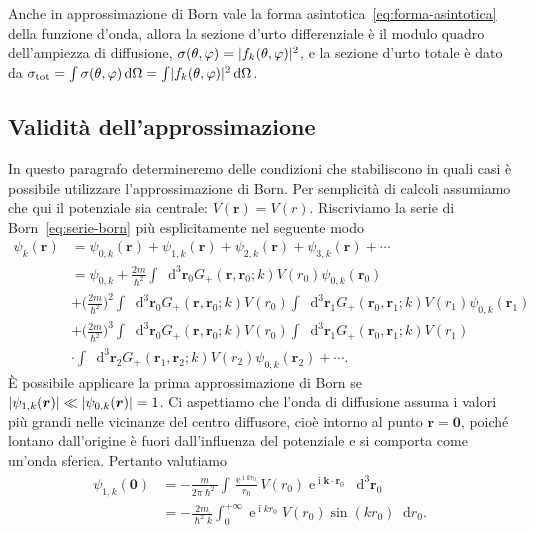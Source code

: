 \documentclass[a4paper,fleqn,twoside,12pt]{article}
\renewcommand{\phi}{\varphi}
\newcommand*{\dd}{\mathop{}\!\mathrm{d}} %
\DeclareMathOperator{\e}{\mathrm{e}} %
\DeclareMathOperator{\uimm}{\mathrm{i}} %
\DeclarePairedDelimiter{\abs}{\lvert}{\rvert}
\begin{document}
Anche in approssimazione di Born vale la forma
asintotica~\eqref{eq:forma-asintotica} della funzione d'onda, allora la sezione
d'urto differenziale è il modulo quadro dell'ampiezza di diffusione,
$\sigma(\theta,\phi) = \abs{f_{k}(\theta,\phi)}^{2}$, e la sezione d'urto totale
è dato da
$\sigma_{\textup{tot}} = \int \sigma(\theta,\phi) \dd\Omega = \int
\abs{f_{k}(\theta,\phi)}^{2} \dd\Omega$.

\subsection{Validità dell'approssimazione}
\label{sec:validita-born}

In questo paragrafo determineremo delle condizioni che stabiliscono in quali
casi è possibile utilizzare l'approssimazione di Born.  Per semplicità di
calcoli assumiamo che qui il potenziale sia centrale: $V(\bm{r}) = V(r)$.
Riscriviamo la serie di Born~\eqref{eq:serie-born} più esplicitamente nel
seguente modo
\begin{equation}
  \label{eq:serie-born-esplicita}
  \begin{split}
    \psi_{k}(\bm{r}) &= \psi_{0,k}(\bm{r}) + \psi_{1,k}(\bm{r}) +
    \psi_{2,k}(\bm{r}) + \psi_{3,k}(\bm{r}) + \cdots \\
    &=\psi_{0,k} + \frac{2 m}{\hslash^{2}}\int\dd^{3}\bm{r}_{0}
    G_{+}(\bm{r},\bm{r}_{0};k) V(r_{0}) \psi_{0,k}(\bm{r}_{0}) \\
    &+ \bigg(\frac{2m}{\hslash^{2}}\bigg)^{2}
    \int\dd^{3}\bm{r}_{0}G_{+}(\bm{r},\bm{r}_{0};k)
    V(r_{0})\int\dd^{3}\bm{r}_{1} G_{+}(\bm{r}_{0},\bm{r}_{1};k) V(r_{1})
    \psi_{0,k}(\bm{r}_{1}) \\
    &+ \bigg(\frac{2m}{\hslash^{2}}\bigg)^{3}
    \int\dd^{3}\bm{r}_{0}G_{+}(\bm{r},\bm{r}_{0};k)
    V(r_{0})\int\dd^{3}\bm{r}_{1} G_{+}(\bm{r}_{0},\bm{r}_{1};k) V(r_{1}) \\
    &\cdot\int\dd^{3}\bm{r}_{2} G_{+}(\bm{r}_{1},\bm{r}_{2};k) V(r_{2})
    \psi_{0,k}(\bm{r}_{2}) + \cdots.
  \end{split}
\end{equation}
È possibile applicare la prima approssimazione di Born se
$\abs{\psi_{1,k}(\bm{r})} \ll \abs{\psi_{0,k}(\bm{r})} = 1$.  Ci aspettiamo che
l'onda di diffusione assuma i valori più grandi nelle vicinanze del centro
diffusore, cioè intorno al punto $\bm{r} = \bm{0}$, poiché lontano dall'origine
è fuori dall'influenza del potenziale e si comporta come un'onda sferica.
Pertanto valutiamo
\begin{equation}
  \label{eq:foobar}
  \begin{split}
    \psi_{1,k}(\bm{0}) &= -\frac{m}{2\pi\hslash^{2}}\int \frac{\e^{\uimm
        kr_{0}}}{r_{0}} V(r_{0}) \e^{\uimm \bm{k}\cdot\bm{r}_{0}}
    \dd^{3}\bm{r}_{0} \\
    &= -\frac{2m}{\hslash^{2}k} \int_{0}^{+\infty} \e^{\uimm kr_{0}}V(r_{0})
    \sin(kr_{0}) \dd r_{0}.
  \end{split}
\end{equation}
\end{document}

